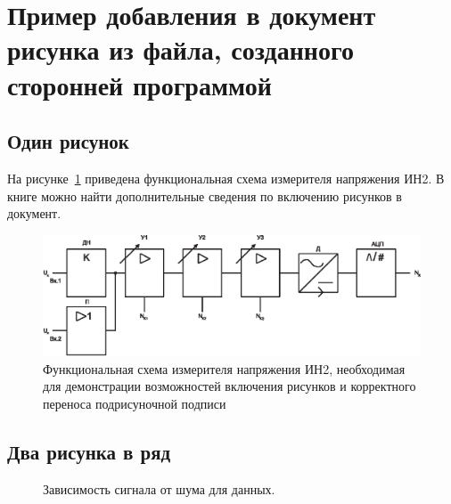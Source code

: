 \section{Пример добавления в документ рисунка из файла, созданного сторонней программой}

\subsection{Один рисунок}

На рисунке~\ref{p:func_in2_1} приведена функциональная 
схема измерителя напряжения ИН2. В книге \cite{gussens} можно найти дополнительные сведения по включению рисунков в документ.


\begin{figure}[!h]
  \includegraphics[width=1\textwidth]{./about/func_in}
  \caption{Функциональная схема измерителя напряжения ИН2, необходимая для демонстрации возможностей включения рисунков и корректного переноса подрисуночной подписи} \label{p:func_in2_1}
\end{figure}


\subsection{Два рисунка в ряд }

\begin{figure}[H]
\begin{minipage}[h]{0.49\linewidth}
\end{minipage}
\hfill
\begin{minipage}[h]{0.49\linewidth}
\end{minipage}
\caption{Зависимость сигнала от шума для данных.}
\label{ris:image1}
\end{figure}



